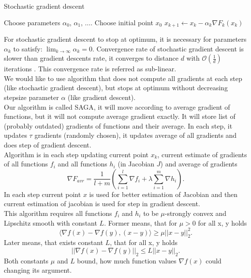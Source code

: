 \documentclass[11pt]{book}
\begin{document}
\begin{algorithm}[H]
	\caption{Stochastic gradient descent}
	\label{alg:sgd}
	\begin{algorithmic}[1]
		\State Choose parameters $\alpha_0$, $\alpha_1$, $\dots$.
		\State Choose initial point $x_0$
		\State $x_{k+1} \leftarrow x_k - \alpha_k\nabla F_k(x_k) $
		\EndFor
	\end{algorithmic}
\end{algorithm}

For stochastic gradient descent to stop at optimum, it is necessary for parameters $\alpha_k$ to satisfy: $\lim_{k \rightarrow \infty}\alpha_k=0 $. Convergence rate of stochastic gradient descent is slower than gradient descents rate, it converges to distance $d$ with $\mathcal{O}(\frac{1}{d})$ iterations \cite{SGD}. This convergence rate is referred as sub-linear.\\

We would like to use algorithm that does not compute all gradients at each step (like stochastic gradient descent), but stops at optimum without decreasing stepsize parameter $\alpha$ (like gradient descent).\\

Our algorithm is called SAGA, it will move according to average gradient of functions, but it will not compute average gradient exactly. It will store list of (probably outdated) gradients of functions and their average. In each step, it updates $\tau$ gradients (randomly chosen), it updates average of all gradients and does step of gradient descent.\\

Algorithm is in each step updating current point $x_k$, current estimate of gradients of all functions $f_i$ and all functions $h_i$ (in Jacobian $J$) and average of gradients $$\nabla F_{avr}= \frac{1}{l+m}\left( \sum_{i=1}^l \nabla f_i + \lambda\sum_{i=1}^m \nabla h_i \right).$$ In each step current point $x$ is used for better estimation of Jacobian and then current estimation of jacobian is used for step in gradient descent.\\

This algorithm requires all functions $f_i$ and $h_i$ to be $\mu$-strongly convex and Lipschitz smooth with constant $L$. Former means, that for $\mu>0$ for all x, y holds $$\langle \nabla f(x) - \nabla f(y), (x-y) \rangle \geq \mu ||x-y||_2^2. $$
Later means, that exists constant $L$, that for all x, y holds $$||\nabla f(x) - \nabla f(y)||_2 \leq L ||x-y||_2.$$ Both constants $\mu$ and $L$ bound, how much function values $\nabla f(x)$ could changing its argument.
\end{document}
